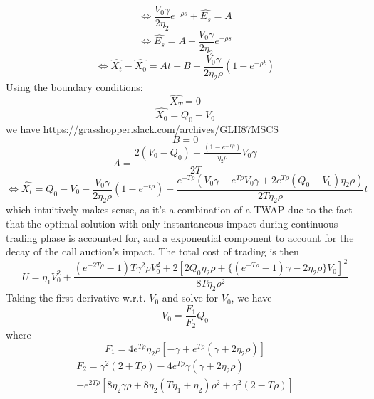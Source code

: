 \documentclass{article}
\begin{document}
\[
\Leftrightarrow \frac{V_0 \gamma}{2\eta_2} e^{-\rho s}  + \hat{E_s} = A
\]
\[
\Leftrightarrow \hat{E_s} = A - \frac{V_0 \gamma}{2\eta_2} e^{-\rho s}
\]
\[
\Leftrightarrow \hat{X_t} - \hat{X_0} = At + B - \frac{V_0 \gamma}{2\eta_2 \rho} (1 - e^{-\rho t})
\]
Using the boundary conditions:
\[
\hat{X_T} = 0
\]
\[
\hat{X_0} = Q_0 - V_0
\]
we have https://grasshopper.slack.com/archives/GLH87MSCS
\[
B = 0
\]
\[
A = \frac{2 (V_0 - Q_0) + \frac{(1 - e^{-T \rho})}{\eta_2 \rho} V_0 \gamma} {2 T}
\]
\[
\Leftrightarrow \hat{X_t} = Q_0 - V_0  - \frac{V_0 \gamma}{2 \eta_2 \rho}(1 - e^{-t \rho}) - \frac{e^{-T \rho} (V_0 \gamma - e^{T \rho}V_0 \gamma + 2 e^{T \rho} (Q_0 - V_0) \eta_2 \rho )}{2 T \eta_2 \rho} t
\]
which intuitively makes sense, as it's a combination of a TWAP due to the fact that the optimal solution with only instantaneous impact during continuous trading phase is accounted for, and a exponential component to account for the decay of the call auction's impact. The total cost of trading is then
\[
U = \eta_1 V_0^2 + \frac{(e^{-2 T \rho} - 1) T \gamma^2 \rho V_0^2 + 2 [2 Q_0 \eta_2 \rho + \{(e^{-T \rho} - 1) \gamma - 2 \eta_2 \rho\} V_0]^2}{8 T \eta_2 \rho^2}
\]
Taking the first derivative w.r.t. $V_0$ and solve for $V_0$, we have
\[
V_0 = \frac{F_1}{F_2} Q_0 
\]
where 
\[
F_1 = 4 e^{T \rho} \eta_2 \rho [-\gamma + e^{T \rho} (\gamma + 2 \eta_2 \rho)]
\]
\begin{equation}
\begin{split}
F_2 = \gamma^2 (2 + T \rho) - 4 e^{T \rho} \gamma (\gamma + 2 \eta_2 \rho)\ \\
+ e^{2 T \rho} [8 \eta_2 \gamma \rho + 8 \eta_2 (T \eta_1 + \eta_2) \rho^2 + \gamma^2 (2 - T \rho)]
\end{split}
\end{equation}
\end{document}
